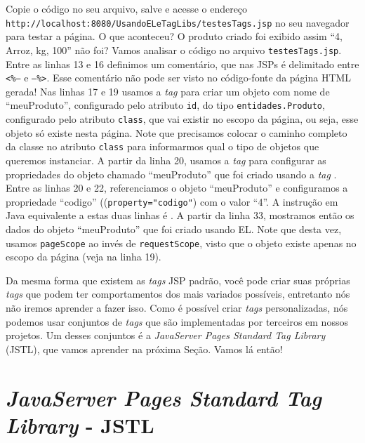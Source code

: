 Copie o código no seu arquivo, salve e acesse o endereço \linebreak \texttt{http://localhost:8080/UsandoELeTagLibs/testesTags.jsp} no seu navegador para testar a página. O que aconteceu? O produto criado foi exibido assim ``4, Arroz, kg, 100'' não foi? Vamos analisar o código no arquivo \texttt{testesTags.jsp}. Entre as linhas 13 e 16 definimos um comentário, que nas JSPs é delimitado entre \texttt{<\%--} e \texttt{--\%>}. Esse comentário não pode ser visto no código-fonte da página HTML gerada! Nas linhas 17 e 19 usamos a \textit{tag}  para criar um objeto com nome de ``meuProduto'', configurado pelo atributo \texttt{id}, do tipo \texttt{entidades.Produto}, configurado pelo atributo \texttt{class}, que vai existir no escopo da página, ou seja, esse objeto só existe nesta página. Note que precisamos colocar o caminho completo da classe no atributo \texttt{class} para informarmos qual o tipo de objetos que queremos instanciar. A partir da linha 20, usamos a \textit{tag}  para configurar as propriedades do objeto chamado ``meuProduto'' que foi criado usando a \textit{tag} . Entre as linhas 20 e 22, referenciamos o objeto ``meuProduto'' e configuramos a propriedade ``codigo'' ((\texttt{property="codigo"}) com o valor ``4''. A instrução em Java equivalente a estas duas linhas é . A partir da linha 33, mostramos então os dados do objeto ``meuProduto'' que foi criado usando EL. Note que desta vez, usamos \texttt{pageScope} ao invés de \texttt{requestScope}, visto que o objeto existe apenas no escopo da página (veja na linha 19).

Da mesma forma que existem as \textit{tags} JSP padrão, você pode criar suas próprias \textit{tags} que podem ter comportamentos dos mais variados possíveis, entretanto nós não iremos aprender a fazer isso. Como é possível criar \textit{tags} personalizadas, nós podemos usar conjuntos de \textit{tags} que são implementadas por terceiros em nossos projetos. Um desses conjuntos é a \textit{JavaServer Pages Standard Tag Library} (JSTL), que vamos aprender na próxima Seção. Vamos lá então!



\section{\textit{JavaServer Pages Standard Tag Library} - JSTL}

